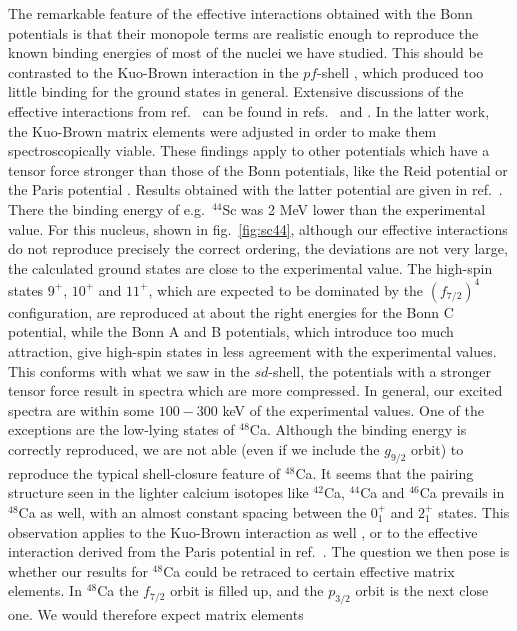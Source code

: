 The remarkable feature of the effective interactions
obtained with the Bonn potentials is that their monopole
terms are realistic enough to reproduce the known
binding energies of most of the nuclei we have studied.
This should be contrasted to the Kuo-Brown interaction
in the $pf$-shell \cite{kb68}, which produced too little
binding for the ground states in general. Extensive
discussions of the effective interactions from ref.\ \cite{kb68}
can be found in refs.\ \cite{richt91} and
\cite{pz80}. In the latter work, the Kuo-Brown
matrix elements were adjusted in order to make
them spectroscopically viable.
These findings
apply to other potentials which have a tensor force
stronger than those of the Bonn potentials, like
the Reid potential \cite{reid68} or the Paris potential
\cite{paris80}. Results obtained with the latter potential
are given in ref.\
\cite{heho92}. There the binding energy of e.g.\
$^{44}$Sc was 2 MeV lower than the experimental value.
For this nucleus, shown in fig.\ \ref{fig:sc44},
although our effective interactions
do not
reproduce precisely the correct ordering, the deviations
are not very large, the calculated ground states are close
to the experimental value. The high-spin states
$9^+$, $10^+$ and $11^+$, which are expected to be dominated by the
$(f_ {7/2})^4$ configuration, are reproduced
at about the right energies for the Bonn C potential,
while the Bonn A and B potentials, which introduce too much attraction,
give high-spin states in less agreement with
the experimental values. This
conforms with what we saw in the $sd$-shell, the potentials
with a stronger tensor force result in spectra which are
more compressed.
In general, our excited spectra are within some $100-300$ keV
of the experimental values.   One of the exceptions are the low-lying
states of $^{48}$Ca. Although the binding energy is correctly
reproduced, we are not able (even if we include the $g_{9/2}$
orbit) to reproduce the typical shell-closure feature of
$^{48}$Ca. It seems that the pairing structure
seen in the lighter calcium isotopes like
$^{42}$Ca, $^{44}$Ca and $^{46}$Ca prevails
in $^{48}$Ca as well, with an almost constant
spacing between the $0_1^+$ and $2_1^+$
states.
This observation applies to the Kuo-Brown
interaction as well \cite{richt91}, or to the effective
interaction derived from the Paris potential in ref.\
\cite{heho92}.
The question we then pose is whether our results for $^{48}$Ca could
be retraced to certain effective matrix elements. In $^{48}$Ca the
$f_{7/2}$ orbit is filled up, and the $p_{3/2}$ orbit is the next close
one. We would therefore expect matrix elements
